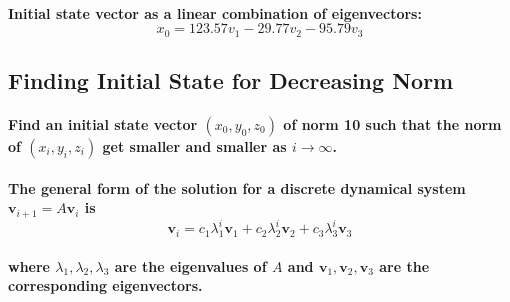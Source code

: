 \paragraph{\textbf{Initial state vector as a linear combination of eigenvectors:}$$ x_0 = 123.57 v_1 -29.77 v_2  -95.79 v_3 $$}
% 
% 
% 
% 
% 
% 
% 
% 
\subsection{Finding Initial State for Decreasing Norm}
\paragraph{Find an initial state vector $(x_0,y_0,z_0)$ of norm 10 such that the norm of $(x_i,y_i,z_i)$ get smaller and smaller as $i \rightarrow \infty$.}
% 
% 
% 
% 
\paragraph{The general form of the solution for a discrete dynamical system $\mathbf{v}_{i+1} = A \mathbf{v}_i $  is
    $$ \mathbf{v}_i = c_1 \lambda_1^i \mathbf{v}_1 + c_2 \lambda_2^i \mathbf{v}_2 + c_3 \lambda_3^i \mathbf{v}_3 $$}
% 
% 
% 
% 
% 
\paragraph{where $ \lambda_1, \lambda_2, \lambda_3 $ are the eigenvalues of \(A\) and \(\mathbf{v}_1, \mathbf{v}_2, \mathbf{v}_3\) are the corresponding eigenvectors.}
% 
% 
% 
%
